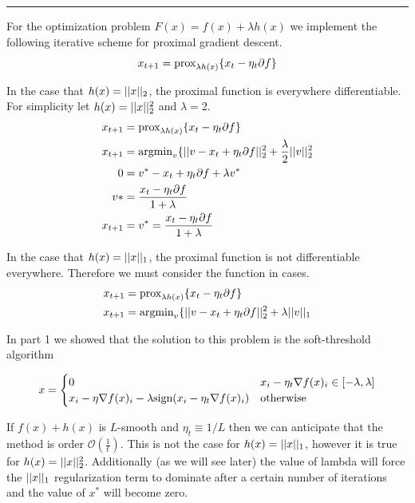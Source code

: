 \documentclass[11pt, answers]{exam}
\begin{document}
\begin{questions}
\begin{solution}
		\vspace{.5in}\hrule\vspace{.5in}

		For the optimization problem $F(x)=f(x)+\lambda h(x)$
		we implement the following iterative scheme for proximal gradient descent.
		$$ x_{t+1}=\text{prox}_{\lambda h(x)}\{x_t -\eta_t\partial f\}$$
		
		In the case that $h(x)=|| x ||_2$, the proximal function is everywhere differentiable.
		For simplicity let $h(x)=|| x ||_2^2$ and $\lambda=2$.
		\begin{align*}
			x_{t+1}&=\text{prox}_{\lambda h(x)}\{x_t -\eta_t\partial f\}\\
			x_{t+1}&=\text{argmin}_v\{|| v-x_t +\eta_t\partial f ||_2^2+\frac{\lambda}{2} || v ||_2^2\\
			0&=v^*-x_t +\eta_t\partial f+\lambda v^*\\
			v* &= \frac{x_t-\eta_t\partial f}{1+\lambda}\\
			x_{t+1}&=v^* = \frac{x_t-\eta_t\partial f}{1+\lambda}
		\end{align*}
		
				In the case that $h(x)=|| x ||_1$, the proximal function is not differentiable everywhere.
				Therefore we must consider the function in cases.
		\begin{align*}
			x_{t+1}&=\text{prox}_{\lambda h(x)}\{x_t -\eta_t\partial f\}\\
			x_{t+1}&=\text{argmin}_v\{|| v-x_t +\eta_t\partial f ||_2^2+\lambda || v ||_1
		\end{align*}	
		
		In part 1 we showed that the solution to this problem is the soft-threshold algorithm
		
		\begin{align*}
			x = \begin{cases}0 & x_i-\eta_t\nabla f(x)_i\in [-\lambda, \lambda]\\
			x_i-\eta\nabla f(x)_i-\lambda\text{sign}(x_i-\eta_t\nabla f(x)_i) & \text{otherwise}
		\end{cases}
		\end{align*}
		
		If $f(x)+h(x)$ is $L$-smooth and $\eta_t\equiv 1/L$ then we can anticipate that the method is order $\mathcal{O}(\frac{1}{t})$.
		This is not the case for $h(x)=|| x ||_1$, however it is true for $h(x)=|| x ||_2^2$. 
		Additionally (as we will see later) the value of lambda will force the $|| x ||_1$ regularization term to dominate after a certain number of iterations and the value of $x^*$ will become zero.
		

\end{solution}
\end{questions}
\end{document}
